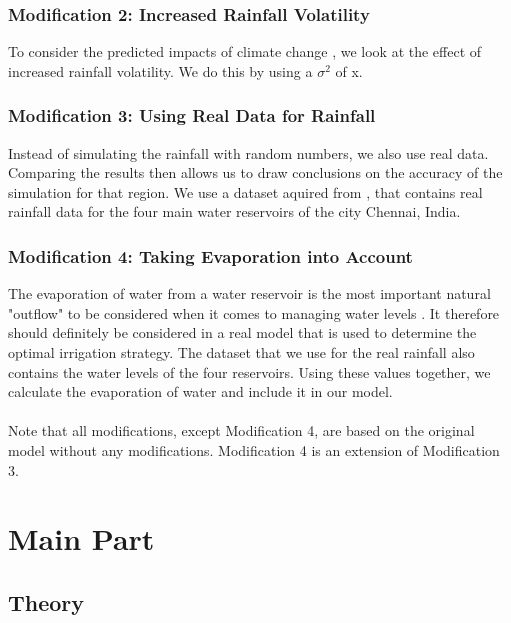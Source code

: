 \documentclass[12pt, a4paper, oneside]{article}
\begin{document}
\subsubsection{Modification 2: Increased Rainfall Volatility}
To consider the predicted impacts of climate change \citep{guhathakurta2011impact}, we look at the effect of increased rainfall volatility. 
We do this by using a  $\sigma^2$ of x.

\subsubsection{Modification 3: Using Real Data for Rainfall}
Instead of simulating the rainfall with random numbers, we also use real data.
Comparing the results then allows us to draw conclusions on the accuracy of the simulation for that region. 
We use a dataset aquired from \cite{kaggle:2019}, that contains real rainfall data for the four main water reservoirs of the city Chennai, India. %

\subsubsection{Modification 4: Taking Evaporation into Account}
The evaporation of water from a water reservoir is the most important natural "outflow" to be considered when it comes to managing water levels \citep{tanny2008evaporation}.
It therefore should definitely be considered in a real model that is used to determine the optimal irrigation strategy.
The dataset that we use for the real rainfall also contains the water levels of the four reservoirs.
Using these values together, we calculate the evaporation of water and include it in our model. \\\\


Note that all modifications, except Modification 4, are based on the original model without any modifications.
Modification 4 is an extension of Modification 3. 

	
	\section{Main Part}
	\subsection{Theory}
	
\end{document}
